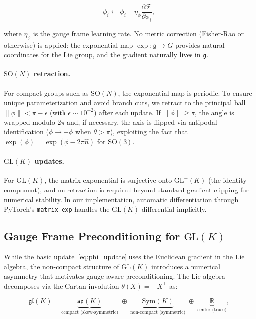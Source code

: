 \documentclass[twoside,11pt]{article}
\begin{document}
\begin{equation}
\phi_i \leftarrow \phi_i - \eta_\phi \frac{\partial \mathcal{F}}{\partial \phi_i},
\label{eq:phi_update}
\end{equation}

where $\eta_\phi$ is the gauge frame learning rate. No metric correction (Fisher-Rao or otherwise) is applied: the exponential map $\exp: \mathfrak{g} \to G$ provides natural coordinates for the Lie group, and the gradient naturally lives in $\mathfrak{g}$.

\paragraph{$\mathrm{SO}(N)$ retraction.} For compact groups such as $\mathrm{SO}(N)$, the exponential map is periodic. To ensure unique parameterization and avoid branch cuts, we retract to the principal ball $\|\phi\| < \pi - \epsilon$ (with $\epsilon \sim 10^{-2}$) after each update. If $\|\phi\| \geq \pi$, the angle is wrapped modulo $2\pi$ and, if necessary, the axis is flipped via antipodal identification ($\phi \to -\phi$ when $\theta > \pi$), exploiting the fact that $\exp(\phi) = \exp(\phi - 2\pi \hat{n})$ for $\mathrm{SO}(3)$.

\paragraph{$\mathrm{GL}(K)$ updates.} For $\mathrm{GL}(K)$, the matrix exponential is surjective onto $\mathrm{GL}^+(K)$ (the identity component), and no retraction is required beyond standard gradient clipping for numerical stability. In our implementation, automatic differentiation through PyTorch's \texttt{matrix\_exp} handles the $\mathrm{GL}(K)$ differential implicitly.

\subsection{Gauge Frame Preconditioning for $\mathrm{GL}(K)$}
\label{sec:glk_preconditioning}

While the basic update~\eqref{eq:phi_update} uses the Euclidean gradient in the Lie algebra, the non-compact structure of $\mathrm{GL}(K)$ introduces a numerical asymmetry that motivates gauge-aware preconditioning. The Lie algebra decomposes via the Cartan involution $\theta(X) = -X^\top$ as:

\begin{equation}
\mathfrak{gl}(K) = \underbrace{\mathfrak{so}(K)}_{\text{compact (skew-symmetric)}} \;\oplus\; \underbrace{\mathrm{Sym}(K)}_{\text{non-compact (symmetric)}} \;\oplus\; \underbrace{\mathbb{R}}_{\text{center (trace)}},
\label{eq:cartan_decomposition}
\end{equation}
\end{document}
